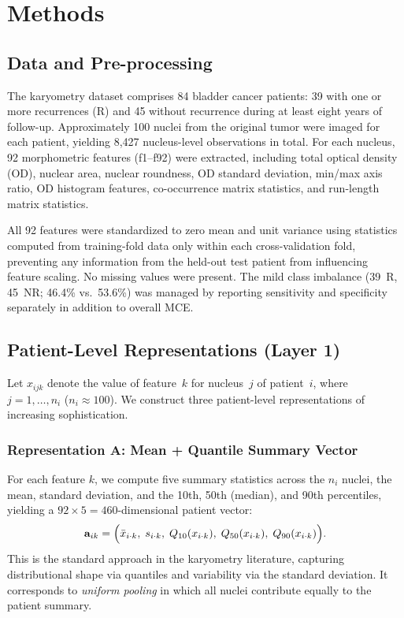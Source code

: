 \documentclass[12pt, onecolumn]{article}
\begin{document}
\section{Methods}

\subsection{Data and Pre-processing}

The karyometry dataset \citep{korde2009} comprises 84 bladder cancer patients: 39 with one or more recurrences (R) and 45 without recurrence during at least eight years of follow-up. Approximately 100 nuclei from the original tumor were imaged for
each patient, yielding 8,427 nucleus-level observations in total. For each nucleus, 92 morphometric features (f1--f92) were
extracted, including total optical density (OD), nuclear area, nuclear roundness, OD standard deviation, min/max axis ratio, OD histogram features, co-occurrence matrix statistics, and run-length matrix statistics.

All 92 features were standardized to zero mean and unit variance using statistics computed from training-fold data only within each cross-validation fold, preventing any information from the held-out test patient from influencing feature scaling. No missing
values were present. The mild class imbalance (39~R, 45~NR; 46.4\% vs.\ 53.6\%) was managed by reporting sensitivity and specificity separately in addition to overall MCE.

\subsection{Patient-Level Representations (Layer 1)}

Let $x_{ijk}$ denote the value of feature~$k$ for nucleus~$j$ of patient~$i$, where $j = 1,\ldots,n_i$ ($n_i \approx 100$). We construct three patient-level representations of increasing sophistication.

\subsubsection{Representation A: Mean + Quantile Summary Vector}

For each feature $k$, we compute five summary statistics across the $n_i$ nuclei, the mean, standard deviation, and the 10th, 50th (median), and 90th percentiles, yielding a $92\times5 = 460$-dimensional patient vector:
\begin{equation}
  \mathbf{a}_{ik} =
  \Bigl(
    \bar{x}_{i\cdot k},\;
    s_{i\cdot k},\;
    Q_{10}(x_{i\cdot k}),\;
    Q_{50}(x_{i\cdot k}),\;
    Q_{90}(x_{i\cdot k})
  \Bigr).
  \label{eq:repA}
\end{equation}
This is the standard approach in the karyometry literature, capturing distributional shape via quantiles and variability via the standard deviation. It corresponds to \emph{uniform pooling}
in which all nuclei contribute equally to the patient summary.
\end{document}
